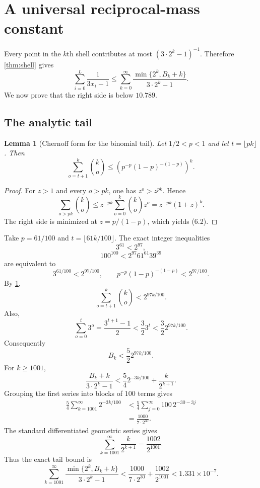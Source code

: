\documentclass[11pt]{article}
\newtheorem{lemma}[theorem]{Lemma}
\theoremstyle{definition}
\theoremstyle{remark}
\begin{document}
\section{A universal reciprocal-mass constant}\label{sec:mass}

Every point in the $k$th shell contributes at most
$(3\cdot2^k-1)^{-1}$.  Therefore \cref{thm:shell} gives
\[
 \sum_{i=0}^{L}\frac1{3x_i-1}
 \le
 \sum_{k=0}^{\infty}
 \frac{\min\{2^k,B_k+k\}}{3\cdot2^k-1}.              \tag{6.1}
\]
We now prove that the right side is below $10.789$.

\subsection{The analytic tail}

\begin{lemma}[Chernoff form for the binomial tail]\label{lem:chernoff}
Let $1/2<p<1$ and let $t=\lfloor pk\rfloor$.  Then
\[
 \sum_{o=t+1}^k\binom{k}{o}
 \le\left(p^{-p}(1-p)^{-(1-p)}\right)^k.             \tag{6.2}
\]
\end{lemma}

\begin{proof}
For $z>1$ and every $o>pk$, one has $z^o>z^{pk}$.  Hence
\[
 \sum_{o>pk}\binom{k}{o}
 \le z^{-pk}\sum_{o=0}^k\binom{k}{o}z^o
 =z^{-pk}(1+z)^k.
\]
The right side is minimized at $z=p/(1-p)$, which yields \textup{(6.2)}.
\end{proof}

Take $p=61/100$ and $t=\lfloor61k/100\rfloor$.  The exact integer
inequalities
\[
 3^{61}<2^{97},                                        \tag{6.3}
\]
\[
 100^{100}<2^{97}61^{61}39^{39}                       \tag{6.4}
\]
are equivalent to
\[
 3^{61/100}<2^{97/100},
 \qquad
 p^{-p}(1-p)^{-(1-p)}<2^{97/100}.
\]
By \cref{lem:chernoff},
\[
 \sum_{o=t+1}^k\binom{k}{o}<2^{97k/100}.              \tag{6.5}
\]
Also,
\[
 \sum_{o=0}^t3^o=\frac{3^{t+1}-1}{2}
 <\frac32 3^t
 <\frac32 2^{97k/100}.                                \tag{6.6}
\]
Consequently
\[
 B_k<\frac52 2^{97k/100}.                              \tag{6.7}
\]
For $k\ge1001$,
\[
 \frac{B_k+k}{3\cdot2^k-1}
 <\frac54 2^{-3k/100}+\frac{k}{2^{k+1}}.              \tag{6.8}
\]
Grouping the first series into blocks of $100$ terms gives
\[
 \begin{aligned}
 \frac54\sum_{k=1001}^{\infty}2^{-3k/100}
 &<\frac54\sum_{j=0}^{\infty}100\,2^{-30-3j}\\
 &=\frac{1000}{7\cdot2^{30}}.
 \end{aligned}                                        \tag{6.9}
\]
The standard differentiated geometric series gives
\[
 \sum_{k=1001}^{\infty}\frac{k}{2^{k+1}}
 =\frac{1002}{2^{1001}}.                               \tag{6.10}
\]
Thus the exact tail bound is
\[
 \sum_{k=1001}^{\infty}
 \frac{\min\{2^k,B_k+k\}}{3\cdot2^k-1}
 <\frac{1000}{7\cdot2^{30}}+\frac{1002}{2^{1001}}
 <1.331\times10^{-7}.                                  \tag{6.11}
\]
\end{document}
